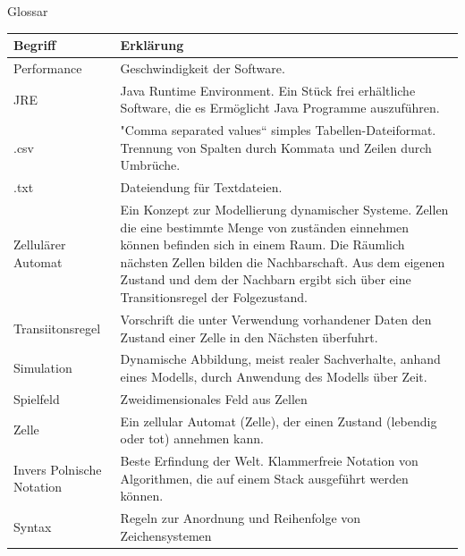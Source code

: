 \documentclass[11pt,a4paper]{article}
\begin{document}
\par
Glossar
\par
\begin{longtable}[m]{|m{8cm}|m{8cm}|}
\hline
Begriff & Erklärung \\
    \hline
  Performance   & Geschwindigkeit der Software. \\
  \hline
JRE  & Java Runtime Environment. Ein Stück frei erhältliche Software, die es Ermöglicht Java Programme auszuführen. \\
    \hline
.csv  & "Comma separated values“ simples Tabellen-Dateiformat. Trennung von Spalten durch Kommata und Zeilen durch Umbrüche. \\
    \hline
.txt  & Dateiendung für Textdateien.\\
    \hline
 Zellulärer Automat & Ein Konzept zur Modellierung dynamischer Systeme.
Zellen die eine bestimmte Menge von zuständen einnehmen können befinden sich in einem Raum. Die Räumlich nächsten Zellen bilden die Nachbarschaft. Aus dem eigenen Zustand und dem der Nachbarn ergibt sich über eine Transitionsregel der Folgezustand.
\\
    \hline
 Transiitonsregel & Vorschrift die unter Verwendung vorhandener Daten den Zustand einer Zelle in den Nächsten überfuhrt.\\  
  \hline
 Simulation & Dynamische Abbildung, meist realer Sachverhalte, anhand eines Modells, durch Anwendung des Modells über Zeit.\\
  \hline
  Spielfeld & Zweidimensionales Feld aus Zellen\\
  \hline
  Zelle & Ein zellular Automat (Zelle), der einen Zustand (lebendig oder tot) annehmen kann.\\
  \hline
  Invers Polnische Notation & Beste Erfindung der Welt. Klammerfreie Notation von Algorithmen, die auf einem Stack ausgeführt werden können.\\
  \hline
  Syntax & Regeln zur Anordnung und Reihenfolge von Zeichensystemen\\
  \hline


\end{longtable}
\end{document}
